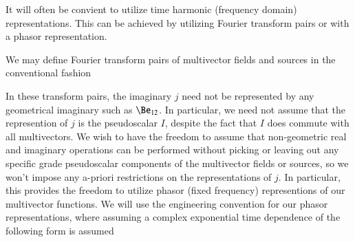 %
%
It will often be convient to utilize time harmonic (frequency domain) representations.
This can be achieved by utilizing Fourier transform pairs or with a phasor representation.

We may define Fourier transform pairs of multivector fields and sources in the conventional fashion


In these transform pairs, the imaginary \( j \) need not be represented by any geometrical imaginary such as \( \Be_{12} \).
In particular, we need not assume that the represention of \( j \) is the
 pseudoscalar \( I \), despite the fact that \( I \) does commute with all  multivectors.
We wish to have the freedom to
assume that non-geometric real and imaginary operations can be performed without picking or leaving out any specific grade pseudoscalar components of the multivector fields or sources, so we won't impose any a-priori restrictions on the representations of \( j \).
In particular, this provides the freedom to utilize phasor (fixed frequency) representions of our multivector functions.
We will use the engineering convention for our
phasor representations, where assuming a complex exponential time dependence of the following form is assumed


